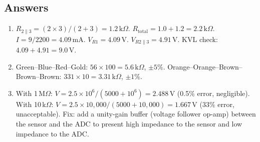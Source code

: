 \subsection{Answers}
\begin{enumerate}[leftmargin=1.5em]
\item $R_{2\|3} = (2 \times 3)/(2+3) = 1.2\,\text{k}\Omega$. $R_{\text{total}} = 1.0 + 1.2 = 2.2\,\text{k}\Omega$. $I = 9/2200 = 4.09$\,mA. $V_{R1} = 4.09$\,V. $V_{R2\|3} = 4.91$\,V. KVL check: $4.09 + 4.91 = 9.0$\,V.
\item Green--Blue--Red--Gold: $56 \times 100 = 5.6\,\text{k}\Omega$, $\pm 5\%$. Orange--Orange--Brown--Brown--Brown: $331 \times 10 = 3.31\,\text{k}\Omega$, $\pm 1\%$.
\item With 1\,M$\Omega$: $V = 2.5 \times 10^6/(5000 + 10^6) = 2.488$\,V (0.5\% error, negligible). With 10\,k$\Omega$: $V = 2.5 \times 10{,}000/(5000 + 10{,}000) = 1.667$\,V (33\% error, unacceptable). Fix: add a unity-gain buffer (voltage follower op-amp) between the sensor and the ADC to present high impedance to the sensor and low impedance to the ADC.
\end{enumerate}




